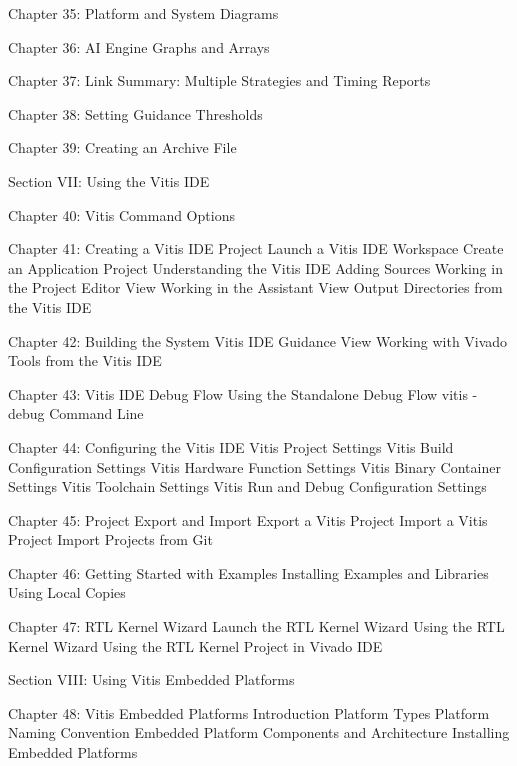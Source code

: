     Chapter 35: Platform and System Diagrams

    Chapter 36: AI Engine Graphs and Arrays       

    Chapter 37: Link Summary: Multiple Strategies and Timing
        Reports   

    Chapter 38: Setting Guidance Thresholds       

    Chapter 39: Creating an Archive File 


Section  VII: Using the Vitis IDE        

    Chapter 40: Vitis Command Options    

    Chapter 41: Creating a Vitis IDE Project
        Launch a Vitis IDE Workspace   
        Create an Application Project        
        Understanding the Vitis IDE 
        Adding Sources        
        Working in the Project Editor View      
        Working in the Assistant View        
        Output Directories from the Vitis IDE

    Chapter 42: Building the System      
        Vitis IDE Guidance View     
        Working with Vivado Tools from the Vitis IDE     

    Chapter 43: Vitis IDE Debug Flow        
        Using the Standalone Debug Flow
        vitis -debug Command Line   

    Chapter 44: Configuring the Vitis IDE
        Vitis Project Settings
        Vitis Build Configuration Settings      
        Vitis Hardware Function Settings        
        Vitis Binary Container Settings      
        Vitis Toolchain Settings       
        Vitis Run and Debug Configuration Settings       

    Chapter 45: Project Export and Import
        Export a Vitis Project
        Import a Vitis Project
        Import Projects from Git       

    Chapter 46: Getting Started with Examples     
        Installing Examples and Libraries    
        Using Local Copies    

    Chapter 47: RTL Kernel Wizard        
        Launch the RTL Kernel Wizard   
        Using the RTL Kernel Wizard 
        Using the RTL Kernel Project in Vivado IDE    


Section  VIII: Using Vitis Embedded Platforms     

    Chapter 48: Vitis Embedded Platforms    
        Introduction 
        Platform Types        
        Platform Naming Convention     
        Embedded Platform Components and Architecture 
        Installing Embedded Platforms        

